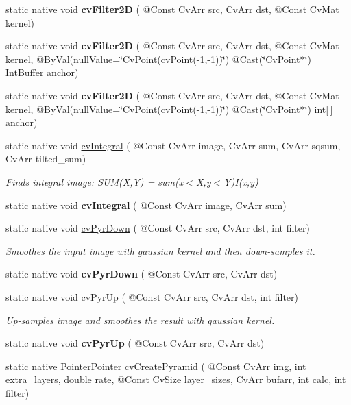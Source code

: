 \begin{DoxyCompactItemize}
static native void {\bfseries cv\+Filter2D} ( @Const Cv\+Arr src, Cv\+Arr dst, @Const Cv\+Mat kernel)
\item 
static native void {\bfseries cv\+Filter2D} ( @Const Cv\+Arr src, Cv\+Arr dst, @Const Cv\+Mat kernel, @By\+Val(null\+Value=\char`\"{}Cv\+Point(cv\+Point(-\/1,-\/1))\char`\"{}) @Cast(\char`\"{}Cv\+Point$\ast$\char`\"{}) Int\+Buffer anchor)
\item 
static native void {\bfseries cv\+Filter2D} ( @Const Cv\+Arr src, Cv\+Arr dst, @Const Cv\+Mat kernel, @By\+Val(null\+Value=\char`\"{}Cv\+Point(cv\+Point(-\/1,-\/1))\char`\"{}) @Cast(\char`\"{}Cv\+Point$\ast$\char`\"{}) int\mbox{[}$\,$\mbox{]} anchor)
\item 
static native void \hyperlink{group__imgproc__c_ga08246108002aef3cbe4402ee61232191}{cv\+Integral} ( @Const Cv\+Arr image, Cv\+Arr sum, Cv\+Arr sqsum, Cv\+Arr tilted\+\_\+sum)
\begin{DoxyCompactList}\small\item\em Finds integral image\+: S\+U\+M(\+X,\+Y) = sum(x$<$\+X,y$<$\+Y)I(x,y) \end{DoxyCompactList}\item 
static native void {\bfseries cv\+Integral} ( @Const Cv\+Arr image, Cv\+Arr sum)
\item 
static native void \hyperlink{group__imgproc__c_ga728d5076e2233678be83cad3203472f9}{cv\+Pyr\+Down} ( @Const Cv\+Arr src, Cv\+Arr dst, int filter)
\begin{DoxyCompactList}\small\item\em Smoothes the input image with gaussian kernel and then down-\/samples it. \end{DoxyCompactList}\item 
static native void {\bfseries cv\+Pyr\+Down} ( @Const Cv\+Arr src, Cv\+Arr dst)
\item 
static native void \hyperlink{group__imgproc__c_ga08b1a7b3bf0f0c133345b307e6dfa952}{cv\+Pyr\+Up} ( @Const Cv\+Arr src, Cv\+Arr dst, int filter)
\begin{DoxyCompactList}\small\item\em Up-\/samples image and smoothes the result with gaussian kernel. \end{DoxyCompactList}\item 
static native void {\bfseries cv\+Pyr\+Up} ( @Const Cv\+Arr src, Cv\+Arr dst)
\item 
static native Pointer\+Pointer \hyperlink{group__imgproc__c_gad819c70ae44efaea82dfbf9745633179}{cv\+Create\+Pyramid} ( @Const Cv\+Arr img, int extra\+\_\+layers, double rate, @Const Cv\+Size layer\+\_\+sizes, Cv\+Arr bufarr, int calc, int filter)

\end{DoxyCompactItemize}
